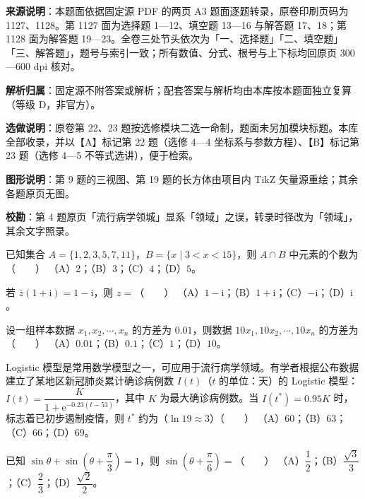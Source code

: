 
\begin{gknotice}
\textbf{来源说明}：本题面依据固定源 PDF 的两页 A3 题面逐题转录，原卷印刷页码为 1127、1128。第 1127 面为选择题 1—12、填空题 13—16 与解答题 17、18；第 1128 面为解答题 19—23。全卷三处节头依次为「一、选择题」「二、填空题」「三、解答题」，题号与索引一致；所有数值、分式、根号与上下标均回原页 300—600 dpi 核对。

\textbf{解析归属}：固定源不附答案或解析；配套答案与解析均由本库按本题面独立复算（等级 D，非官方）。

\textbf{选做说明}：原卷第 22、23 题按选修模块二选一命制，题面未另加模块标题。本库全部收录，并以【A】标记第 22 题（选修 4—4 坐标系与参数方程）、【B】标记第 23 题（选修 4—5 不等式选讲），便于检索。

\textbf{图形说明}：第 9 题的三视图、第 19 题的长方体由项目内 TikZ 矢量源重绘；其余各题原页无图。

\textbf{校勘}：第 4 题原页「流行病学领城」显系「领域」之误，转录时径改为「领域」，其余文字照录。
\end{gknotice}
\begin{question}
已知集合 $A=\{1,2,3,5,7,11\}$，$B=\{x\mid 3<x<15\}$，则 $A\cap B$ 中元素的个数为\mbox{（　　）}
（A）$2$；（B）$3$；（C）$4$；（D）$5$。
\end{question}
\begin{question}
若 $\bar z(1+\mathrm i)=1-\mathrm i$，则 $z=$\mbox{（　　）}
（A）$1-\mathrm i$；（B）$1+\mathrm i$；（C）$-\mathrm i$；（D）$\mathrm i$。
\end{question}
\begin{question}
设一组样本数据 $x_1,x_2,\cdots,x_n$ 的方差为 $0.01$，则数据 $10x_1,10x_2,\cdots,10x_n$ 的方差为\mbox{（　　）}
（A）$0.01$；（B）$0.1$；（C）$1$；（D）$10$。
\end{question}
\begin{question}
Logistic 模型是常用数学模型之一，可应用于流行病学领域。有学者根据公布数据建立了某地区新冠肺炎累计确诊病例数 $I(t)$（$t$ 的单位：天）的 Logistic 模型：$I(t)=\dfrac K{1+\mathrm e^{-0.23(t-53)}}$，其中 $K$ 为最大确诊病例数。当 $I(t^*)=0.95K$ 时，标志着已初步遏制疫情，则 $t^*$ 约为（$\ln19\approx3$）\mbox{（　　）}
（A）$60$；（B）$63$；（C）$66$；（D）$69$。
\end{question}
\begin{question}
已知 $\sin\theta+\sin\left(\theta+\dfrac\pi3\right)=1$，则 $\sin\left(\theta+\dfrac\pi6\right)=$\mbox{（　　）}
（A）$\dfrac12$；（B）$\dfrac{\sqrt3}3$；（C）$\dfrac23$；（D）$\dfrac{\sqrt2}2$。
\end{question}
